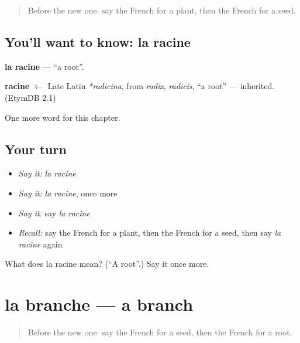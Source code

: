 \label{lesson:FR-C228-racine}



\begin{quote}
Before the new one: say the French for a plant, then the French for a seed.
\end{quote}

\subsection*{You'll want to know: la racine}
\textbf{la racine} — \textquotedblleft{}a root\textquotedblright{}.

\begin{cousinweb}
\textbf{racine} $\leftarrow$ Late Latin \emph{*radicina}, from \emph{radix}, \emph{radicis}, \textquotedblleft{}a root\textquotedblright{} — inherited. (EtymDB 2.1)
\end{cousinweb}

\begin{grammarlens}[title={What you've built}]
One more word for this chapter.
\end{grammarlens}

\subsection*{Your turn}
\begin{itemize}
\raggedright
  \item \emph{Say it:} \emph{la racine}
  \item \emph{Say it:} \emph{la racine}, once more
  \item \emph{Say it:} say \emph{la racine}
  \item \emph{Recall:} say the French for a plant, then the French for a seed, then say \emph{la racine} again
\end{itemize}

\begin{tcolorbox}[breakable,colback=teal!4,colframe=teal!35!black,title={Before you move on}]
What does la racine mean? (\textquotedblleft{}A root\textquotedblright{}.) Say it once more.
\end{tcolorbox}
\section[la branche]{la branche — a branch}

\label{lesson:FR-C228-branche}



\begin{quote}
Before the new one: say the French for a seed, then the French for a root.
\end{quote}

